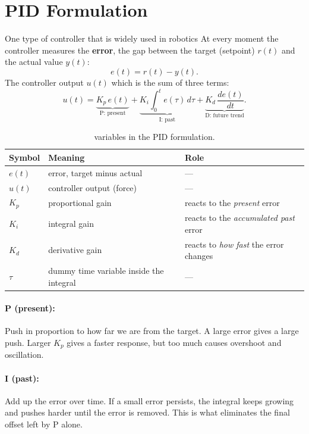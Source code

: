 \documentclass[]{article}
\begin{document}
\section{PID Formulation}
One type of controller that is widely used in robotics
At every moment the controller measures the \textbf{error}, the gap between the target (setpoint) $r(t)$ and the actual value $y(t)$:
\begin{equation}
	e(t) = r(t) - y(t).
\end{equation}
The controller output $u(t)$ which is the sum of three terms:
\begin{equation} 
	u(t) = \underbrace{K_p\,e(t)}_{\text{P: present}} + \underbrace{K_i \int_{0}^{t} e(\tau)\,d\tau}_{\text{I: past}} + \underbrace{K_d\, \frac{de(t)}{dt}}_{\text{D: future trend}} .
	\label{eq:pid} 
\end{equation}

\begin{table}[h]
	\centering
	\begin{tabular}{lll}
		\hline
		Symbol & Meaning & Role \\
		\hline
		$e(t)$ & error, target minus actual & --- \\
		$u(t)$ & controller output (force) & --- \\
		$K_p$ & proportional gain & reacts to the \emph{present} error \\
		$K_i$ & integral gain  & reacts to the \emph{accumulated past} error \\
		$K_d$ & derivative gain & reacts to \emph{how fast} the error changes \\
		$\tau$ & dummy time variable inside the integral & --- \\
		\hline
	\end{tabular}
	\caption{variables in the PID formulation.}
\end{table}




\paragraph{P (present):} Push in proportion to how far we are from the target. A large error gives a large push. Larger $K_p$ gives a faster response, but too much causes overshoot and oscillation.
\paragraph{I (past):} Add up the error over time. If a small error persists, the integral keeps growing and pushes harder until the error is removed. This is what eliminates the final offset left by P alone.
\end{document}
